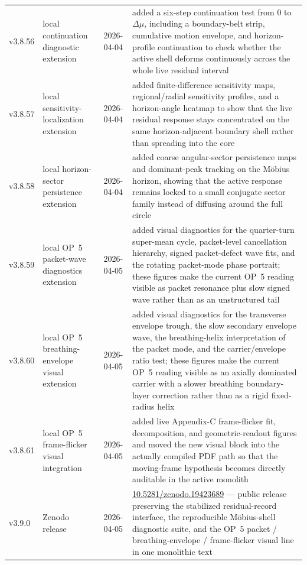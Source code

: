 {\begin{longtable}{|p{}|p{}|p{}|p{}|}
v3.8.56 & local continuation diagnostic extension & 2026-04-04 & added a six-step continuation test from $0$ to $\Delta\mu$, including a boundary-belt strip, cumulative motion envelope, and horizon-profile continuation to check whether the active shell deforms continuously across the whole live residual interval \\
 v3.8.57 & local sensitivity-localization extension & 2026-04-04 & added finite-difference sensitivity maps, regional/radial sensitivity profiles, and a horizon-angle heatmap to show that the live residual response stays concentrated on the same horizon-adjacent boundary shell rather than spreading into the core \\
\hline
v3.8.58 & local horizon-sector persistence extension & 2026-04-04 & added coarse angular-sector persistence maps and dominant-peak tracking on the M\"obius horizon, showing that the active response remains locked to a small conjugate sector family instead of diffusing around the full circle \\
v3.8.59 & local OP~5 packet-wave diagnostics extension & 2026-04-05 & added visual diagnostics for the quarter-turn super-mean cycle, packet-level cancellation hierarchy, signed packet-defect wave fits, and the rotating packet-mode phase portrait; these figures make the current OP~5 reading visible as packet resonance plus slow signed wave rather than as an unstructured tail \\
v3.8.60 & local OP~5 breathing-envelope visual extension & 2026-04-05 & added visual diagnostics for the transverse envelope trough, the slow secondary envelope wave, the breathing-helix interpretation of the packet mode, and the carrier/envelope ratio test; these figures make the current OP~5 reading visible as an axially dominated carrier with a slower breathing boundary-layer correction rather than as a rigid fixed-radius helix \\
v3.8.61 & local OP~5 frame-flicker visual integration & 2026-04-05 & added live Appendix-C frame-flicker fit, decomposition, and geometric-readout figures and moved the new visual block into the actually compiled PDF path so that the moving-frame hypothesis becomes directly auditable in the active monolith \\
v3.9.0 & Zenodo release & 2026-04-05 & \href{https://doi.org/10.5281/zenodo.19423689}{10.5281/zenodo.19423689} --- public release preserving the stabilized residual-record interface, the reproducible M\"obius-shell diagnostic suite, and the OP~5 packet / breathing-envelope / frame-flicker visual line in one monolithic text \\

\end{longtable}}
